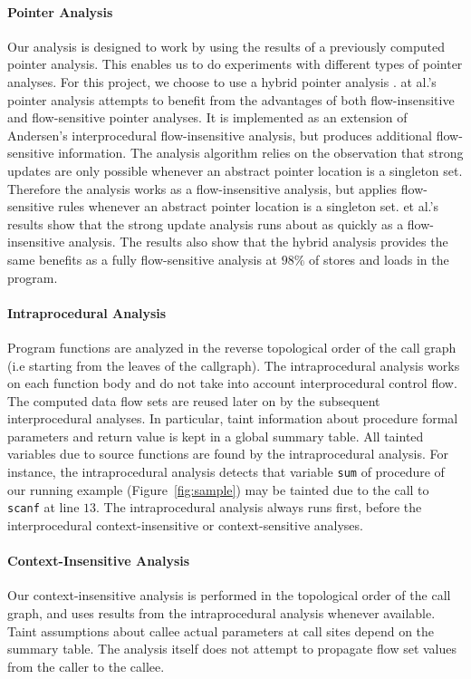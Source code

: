 \paragraph{Pointer Analysis}
Our analysis is designed to work by using the results of
a previously computed pointer analysis. This enables us to
do experiments with different types of pointer
analyses. For this project, we choose to use a hybrid
pointer analysis \cite{Lhotak:2011:PAE}. \lothak{} at al.'s
pointer analysis attempts to benefit from the
advantages of both flow-insensitive and flow-sensitive 
pointer analyses. It is implemented as an extension of
Andersen's interprocedural flow-insensitive analysis, but
produces additional flow-sensitive information. The analysis
algorithm relies on the observation that strong updates
are only possible whenever an abstract pointer location is
a singleton set. Therefore the analysis works as a
flow-insensitive analysis, but applies flow-sensitive
rules whenever an abstract pointer location is a singleton set.
\lothak{} et al.'s results show that the strong update
analysis runs about as quickly as a flow-insensitive analysis.
The results also show that the hybrid
analysis provides the same benefits as a fully flow-sensitive
analysis at $98\%$ of stores and loads in the program.

\paragraph{Intraprocedural Analysis}
Program functions are analyzed in the reverse
topological order of the call graph (i.e starting
from the leaves of the callgraph).
The intraprocedural analysis works on each function
body and do not take into account interprocedural
control flow. The computed data flow sets are reused
later on by the subsequent interprocedural analyses.
In particular, taint information about procedure
formal parameters and return value is kept in a
global summary table.
All tainted variables due to source functions are
found by the intraprocedural analysis. 
For instance, the intraprocedural analysis detects
that variable \texttt{sum} of procedure \compute{}
of our running example (Figure~\ref{fig:sample})
may be tainted due to the call to \texttt{scanf} at
line $13$. The intraprocedural analysis always runs
first, before the interprocedural context-insensitive
or context-sensitive analyses.

\paragraph{Context-Insensitive Analysis}
Our context-insensitive analysis is performed
in the topological order of the call graph, and uses
results from the intraprocedural analysis whenever
available. Taint assumptions about callee actual
parameters at call sites depend on the summary table.
The analysis itself does not attempt to propagate flow
set values from the caller to the callee.

